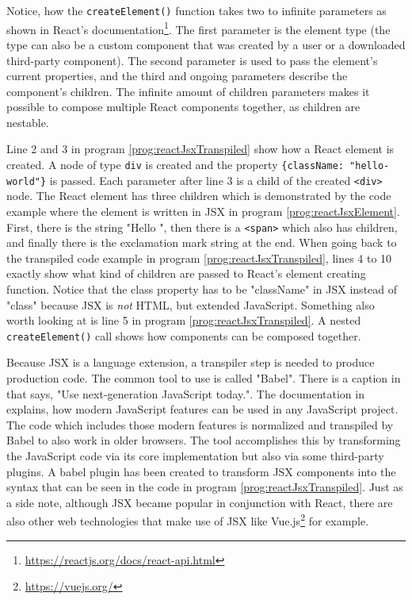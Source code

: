 Notice, how the \texttt{createElement()} function takes two to infinite parameters as shown in React's documentation\footnote{\url{https://reactjs.org/docs/react-api.html}}. The first parameter is the element type (the type can also be a custom component that was created by a user or a downloaded third-party component). The second parameter is used to pass the element's current properties, and the third and ongoing parameters describe the component's children. The infinite amount of children parameters makes it possible to compose multiple React components together, as children are nestable. 

Line 2 and 3 in program \ref{prog:reactJsxTranspiled} show how a React element is created. A node of type \texttt{div} is created and the property \texttt{\{className: "hello-world"\}} is passed. Each parameter after line 3 is a child of the created \texttt{<div>} node. The React element has three children which is demonstrated by the code example where the element is written in JSX in program \ref{prog:reactJsxElement}. First, there is the string "Hello ", then there is a \texttt{<span>} which also has children, and finally there is the exclamation mark string at the end. When going back to the transpiled code example in program \ref{prog:reactJsxTranspiled}, lines 4 to 10 exactly show what kind of children are passed to React's element creating function. Notice that the class property has to be "className" in JSX instead of "class" because JSX is \emph{not} HTML, but extended JavaScript. Something also worth looking at is line 5 in program \ref{prog:reactJsxTranspiled}. A nested \texttt{createElement()} call shows how components can be composed together.

Because JSX is a language extension, a transpiler step is needed to produce production code. The common tool to use is called "Babel". There is a caption in \cite{Babel} that says, "Use next-generation JavaScript today.". The documentation in \cite{Babel} explains, how modern JavaScript features can be used in any JavaScript project. The code which includes those modern features is normalized and transpiled by Babel to also work in older browsers. The tool accomplishes this by transforming the JavaScript code via its core implementation but also via some third-party plugins. A babel plugin has been created to transform JSX components into the syntax that can be seen in the code in program \ref{prog:reactJsxTranspiled}. Just as a side note, although JSX became popular in conjunction with React, there are also other web technologies that make use of JSX like Vue.js\footnote{\url{https://vuejs.org/}} for example.

